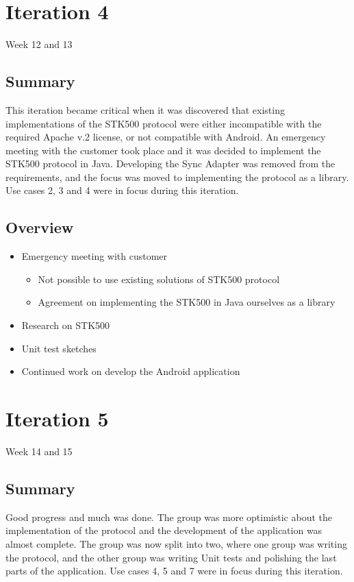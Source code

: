 \section{Iteration 4}
Week 12 and 13
\subsection{Summary}
	This iteration became critical when it was discovered that existing implementations of the STK500 protocol were either incompatible with the required Apache v.2 license, or not compatible with Android. An emergency meeting with the customer took place and it was decided to implement the STK500 protocol in Java. Developing the Sync Adapter was removed from the requirements, and the focus was moved to implementing the protocol as a library. Use cases 2, 3 and 4 were in focus during this iteration.

\subsection{Overview}
\begin{itemize}
	\item{Emergency meeting with customer}
	\begin{itemize}
		\item{Not possible to use existing solutions of STK500 protocol}
		\item{Agreement on implementing the STK500 in Java ourselves as a library}
	\end{itemize}
	\item{Research on STK500}
	\item{Unit test sketches}
	\item{Continued work on develop the Android application}
\end{itemize}

\section{Iteration 5}
Week 14 and 15
\subsection{Summary}
	Good progress and much was done. The group was more optimistic about the implementation of the protocol and the development of the application was almost complete.	The group was now split into two, where one group was writing the protocol, and the other group was writing Unit tests and polishing the last parts of the application. Use cases 4, 5 and 7 were in focus during this iteration.

